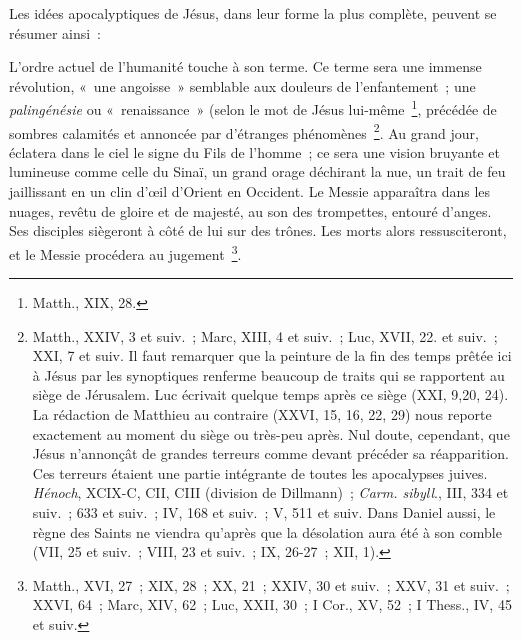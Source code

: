 \documentclass[french,twoside]{book} %
\begin{document}
Les idées apocalyptiques de Jésus, dans leur forme la plus complète, peuvent se résumer ainsi :\par
L’ordre actuel de l’humanité touche à son terme. Ce terme sera une immense révolution, « une angoisse » semblable aux douleurs de l’enfantement ; une {\itshape palingénésie} ou « renaissance » (selon le mot de Jésus lui-même \footnote{Matth., XIX, 28.}, précédée de sombres calamités et annoncée par d’étranges phénomènes \footnote{ Matth., XXIV, 3 et suiv. ; Marc, XIII, 4 et suiv. ; Luc, XVII, 22. et suiv. ; XXI, 7 et suiv. Il faut remarquer que la peinture de la fin des temps prêtée ici à Jésus par les synoptiques renferme beaucoup de traits qui se rapportent au siège de Jérusalem. Luc écrivait quelque temps après ce siège (XXI, 9,20, 24). La rédaction de Matthieu au contraire (XXVI, 15, 16, 22, 29) nous reporte exactement au moment du siège ou très-peu après. Nul doute, cependant, que Jésus n’annonçât de grandes terreurs comme devant précéder sa réapparition. Ces terreurs étaient une partie intégrante de toutes les apocalypses juives. {\itshape Hénoch}, XCIX-C, CII, CIII (division de Dillmann) ; {\itshape Carm. sibyll}., III, 334 et suiv. ; 633 et suiv. ; IV, 168 et suiv. ; V, 511 et suiv. Dans Daniel aussi, le règne des Saints ne viendra qu’après que la désolation aura été à son comble (VII, 25 et suiv. ; VIII, 23 et suiv. ; IX, 26-27 ; XII, 1).}. Au grand jour, éclatera dans le ciel le signe du Fils de l’homme ; ce sera une vision bruyante et lumineuse comme celle du Sinaï, un grand orage déchirant la nue, un trait de feu jaillissant en un clin d’œil d’Orient en Occident. Le Messie apparaîtra dans les nuages, revêtu de gloire et de majesté, au son des trompettes, entouré d’anges. Ses disciples siègeront à côté de lui sur des trônes. Les morts alors ressusciteront, et le Messie procédera au jugement \footnote{Matth., XVI, 27 ; XIX, 28 ; XX, 21 ; XXIV, 30 et suiv. ; XXV, 31 et suiv. ; XXVI, 64 ; Marc, XIV, 62 ; Luc, XXII, 30 ; I Cor., XV, 52 ; I Thess., IV, 45 et suiv.}.\par
\end{document}
